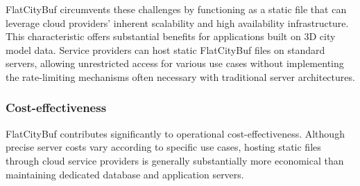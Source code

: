 FlatCityBuf circumvents these challenges by functioning as a static file that can leverage cloud providers' inherent scalability and high availability infrastructure. This characteristic offers substantial benefits for applications built on 3D city model data. Service providers can host static FlatCityBuf files on standard servers, allowing unrestricted access for various use cases without implementing the rate-limiting mechanisms often necessary with traditional server architectures.

\subsubsection{Cost-effectiveness}
\label{cost_effectiveness}

FlatCityBuf contributes significantly to operational cost-effectiveness. Although precise server costs vary according to specific use cases, hosting static files through cloud service providers is generally substantially more economical than maintaining dedicated database and application servers.

